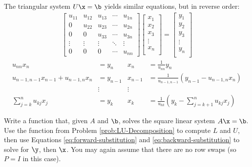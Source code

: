 The triangular system $U\x = \b$ yields similar equations, but in reverse order:
%
\begin{align*}
\left[\begin{array}{ccccc}
u_{11} & u_{12} & u_{13} & \cdots & u_{1n} \\
0      & u_{22} & u_{23} & \cdots & u_{2n} \\
0      & 0      & u_{33} & \cdots & u_{3n} \\
\vdots & \vdots & \vdots & \ddots & \vdots \\
0      & 0      & 0      & \cdots & u_{nn}
\end{array}\right]
\left[\begin{array}{c}
x_1 \\ x_2 \\ x_3 \\ \vdots \\ x_n \\
\end{array}\right]
=
\left[\begin{array}{c}
y_1 \\ y_2 \\ y_3 \\ \vdots \\ y_n \\
\end{array}\right]
\end{align*}
%
\begin{align}
\nonumber u_{nn}x_n &= y_n & x_n &= \frac{1}{u_{nn}}y_n \\
\nonumber u_{n-1,n-1}x_{n-1} + u_{n-1,n}x_{n} &= y_{n-1} & x_{n-1} &= \frac{1}{u_{n-1,n-1}}\left(y_{n-1} - u_{n-1,n}x_{n}\right)\\
\nonumber & \vdots & \vdots & \\
\sum_{j=k}^{n}u_{kj}x_j &= y_k & x_k &= \frac{1}{u_{kk}}\left(y_k - \sum_{j=k+1}^{n}u_{kj}x_j\right)
\label{eq:backward-substitution}
\end{align}

\begin{problem} %
Write a function that, given $A$ and $\b$, solves the square linear system $A\x = \b$.
Use the function from Problem \ref{prob:LU-Decomposition} to compute $L$ and $U$, then use Equations \ref{eq:forward-substitution} and \ref{eq:backward-substitution} to solve for $\y$, then $\x$.
You may again assume that there are no row swaps (so $P = I$ in this case).
\label{prob:substitute-solve}
\end{problem}

